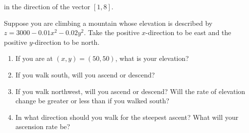 in the direction of the vector $\left[ 1, 8 \right]$. 

\begin{Exercise}[title = {Using the Gradient to find Maximum Change}, 
label = maximum]
Suppose you are climbing a mountain whose elevation is described by $z = 3000 
- 0.01x^2 - 0.02y^2$. Take the positive $x$-direction to be east and the 
positive $y$-direction to be north. 
\begin{enumerate}
    \item If you are at $(x, y) = (50, 50)$, what is your elevation?
    \item If you walk south, will you ascend or descend?
    \item If you walk northwest, will you ascend or descend? Will the rate of 
    elevation change be greater or less than if you walked south?
    \item In what direction should you walk for the steepest ascent? What will 
    your ascension rate be?
\end{enumerate}
\vspace{50mm}
\end{Exercise}

